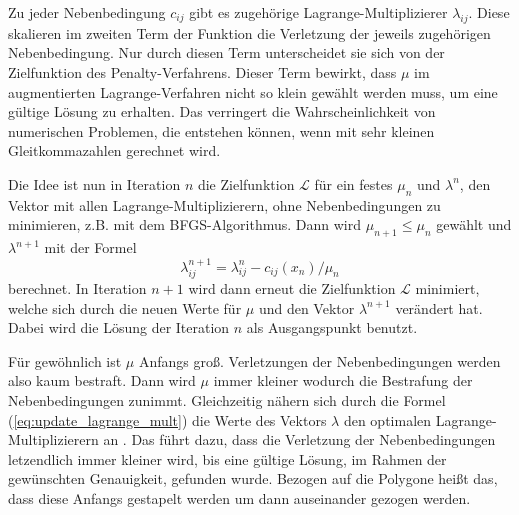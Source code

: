 \documentclass[runningheads,a4paper]{llncs}
\begin{document}
Zu jeder Nebenbedingung $c_{ij}$ gibt es zugehörige Lagrange-Multiplizierer $\lambda_{ij}$. Diese skalieren im zweiten Term der Funktion die Verletzung der jeweils zugehörigen Nebenbedingung. Nur durch diesen Term unterscheidet sie sich von der Zielfunktion des Penalty-Verfahrens. Dieser Term bewirkt, dass $\mu$ im augmentierten Lagrange-Verfahren nicht so klein gewählt werden muss, um eine gültige Lösung zu erhalten. Das verringert die Wahrscheinlichkeit von numerischen Problemen, die entstehen können, wenn mit sehr kleinen Gleitkommazahlen gerechnet wird.

Die Idee ist nun in Iteration $n$ die Zielfunktion $\mathcal{L}$ für ein festes $\mu_n$ und $\lambda^n$, den Vektor mit allen Lagrange-Multiplizierern, ohne Nebenbedingungen zu minimieren, z.B. mit dem BFGS-Algorithmus. Dann wird ${\mu_{n+1} \le \mu_n}$ gewählt und $\lambda^{n+1}$ mit der Formel
\begin{equation}
\label{eq:update_lagrange_mult}
\lambda_{ij}^{n+1} = \lambda_{ij}^n - c_{ij}(x_n)/\mu_n 
\end{equation}
berechnet.
In Iteration $n+1$ wird dann erneut die Zielfunktion $\mathcal{L}$ minimiert, welche sich durch die neuen Werte für $\mu$ und den Vektor $\lambda^{n+1}$ verändert hat. Dabei wird die Lösung der Iteration $n$ als Ausgangspunkt benutzt.

Für gewöhnlich ist $\mu$ Anfangs groß. Verletzungen der Nebenbedingungen werden also kaum bestraft. Dann wird $\mu$ immer kleiner wodurch die Bestrafung der Nebenbedingungen zunimmt. Gleichzeitig nähern sich durch die Formel (\ref{eq:update_lagrange_mult}) die Werte des Vektors $\lambda$ den optimalen Lagrange-Multiplizierern an \cite{nocedal1999numerical}. Das führt dazu, dass die Verletzung der Nebenbedingungen letzendlich immer kleiner wird, bis eine gültige Lösung, im Rahmen der gewünschten Genauigkeit, gefunden wurde. Bezogen auf die Polygone heißt das, dass diese Anfangs gestapelt werden um dann auseinander gezogen werden.
\end{document}
